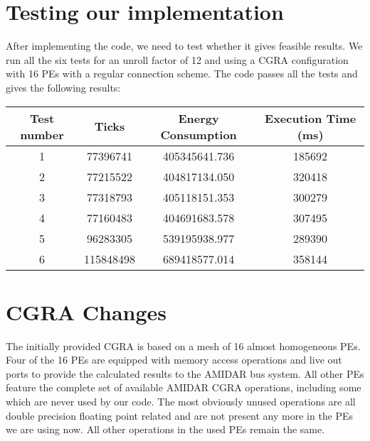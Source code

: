 		\section{Testing our implementation} %
	\label{sec:test_impl}
		After implementing the code, we need to test whether it gives feasible results. We run all the six tests for an unroll factor of 12 and using a CGRA configuration with 16 PEs with a regular connection scheme. The code passes all the tests and gives the following results:
		\begin{center}
			\begin{tabular}{||c | c c c ||} 
			\hline
			Test number & Ticks & Energy Consumption & Execution Time (ms)\\ [0.5ex] 
			\hline\hline
			1 & 77396741 & 405345641.736 & 185692 \\
			\hline
			2 & 77215522 & 404817134.050 & 320418 \\
			\hline
			3 & 77318793 & 405118151.353 & 300279 \\
			\hline
			4 & 77160483 & 404691683.578 & 307495 \\
			\hline
			5 & 96283305 & 539195938.977 & 289390 \\  
			\hline
			6 & 115848498 & 689418577.014 & 358144 \\  
			\hline
			\end{tabular}
		\end{center}
		

	\section{CGRA Changes} %
	\label{sec:cgra_changes}
		The initially provided CGRA is based on a mesh of \num{16} almost homogeneous PEs. Four of the \num{16} PEs are equipped with memory access operations and live out ports to provide the calculated results to the AMIDAR bus system. All other PEs feature the complete set of available AMIDAR CGRA operations, including some which are never used by our code. The most obviously unused operations are all double precision floating point related and are not present any more in the PEs we are using now. All other operations in the used PEs remain the same.\newline
		
